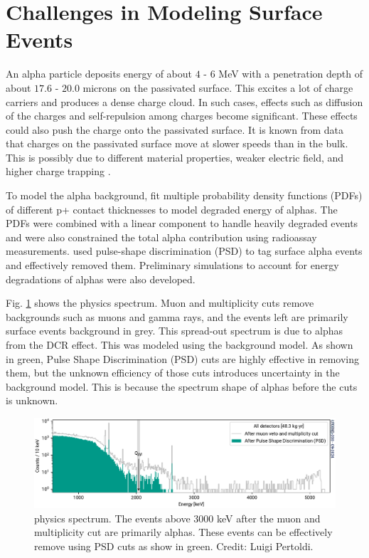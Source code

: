 \section{Challenges in Modeling Surface Events}
An alpha particle deposits energy of about $4$ - $6$ MeV with a penetration depth of about $17.6$ - $20.0$ microns on the passivated surface. This excites a lot of charge carriers and produces a dense charge cloud. In such cases, effects such as diffusion of the charges and self-repulsion among charges become significant. These effects could also push the charge onto the passivated surface. It is known from data that charges on the passivated surface move at slower speeds than in the bulk. This is possibly due to different material properties, weaker electric field, and higher charge trapping \cite{MULLOWNEY201233}.

To model the alpha background, {\Gerda} fit multiple probability density functions (PDFs) of different p+ contact thicknesses to model degraded energy of alphas. The PDFs were combined with a linear component to handle heavily degraded events and were also constrained the total alpha contribution using radioassay measurements. {\MJD} used pulse-shape discrimination (PSD) to tag surface alpha events and effectively removed them. Preliminary simulations to account for energy degradations of alphas were also developed.

Fig. \ref{ch3_fig_L200_surface_background} shows the {\Ltwo} physics spectrum. Muon and multiplicity cuts remove backgrounds such as muons and gamma rays, and the events left are primarily surface events background in grey. This spread-out spectrum is due to alphas from the DCR effect. This was modeled using the {\Gerda} background model. As shown in green, Pulse Shape Discrimination (PSD) cuts are highly effective in removing them, but the unknown efficiency of those cuts introduces uncertainty in the background model. This is because the spectrum shape of alphas before the cuts is unknown.

\begin{figure}[!htb]
\centering
  \includegraphics[width=0.99\linewidth]{ch2/figs/l200-phy-spectrum-psd.pdf}
  \caption{{\Ltwo} physics spectrum. The events above 3000 keV after the muon and multiplicity cut are primarily alphas. These events can be effectively remove using PSD cuts as show in green. Credit: Luigi Pertoldi.}
\label{ch3_fig_L200_surface_background}
\end{figure}

